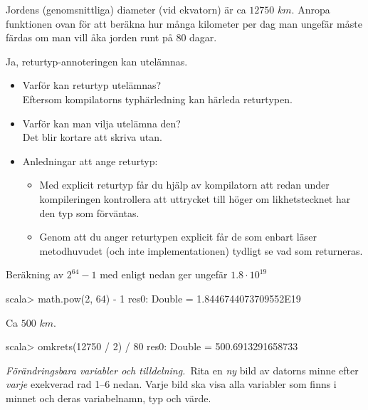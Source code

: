 \Subtask Jordens (genomsnittliga) diameter (vid ekvatorn) är ca $12 750$ $km$. Anropa funktionen  ovan för att beräkna hur många kilometer per dag man ungefär måste färdas om man vill åka jorden runt på 80 dagar. 

\SOLUTION

\TaskSolved \what

\SubtaskSolved Ja, returtyp-annoteringen  kan utelämnas. 

\begin{itemize}
\item Varför kan returtyp utelämnas?\\Eftersom kompilatorns typhärledning kan härleda returtypen. 
\item Varför kan man vilja utelämna den?\\Det blir kortare att skriva utan. 
\item Anledningar att ange returtyp: 
\begin{itemize}
\item  Med explicit returtyp får du hjälp av kompilatorn att redan under kompileringen kontrollera att uttrycket till höger om likhetstecknet har den typ som förväntas. 

\item Genom att du anger returtypen explicit får de som enbart läser metodhuvudet (och inte implementationen)
 tydligt se vad som returneras.
\end{itemize}
\end{itemize}	


\SubtaskSolved Beräkning av $2^{64} - 1$ med  enligt nedan ger ungefär $1.8 \cdot 10^{19}$
\begin{REPL}
scala> math.pow(2, 64) - 1
res0: Double = 1.8446744073709552E19
\end{REPL}


\SubtaskSolved Ca $500$ $km$.
\begin{REPL}
scala> omkrets(12750 / 2) / 80
res0: Double = 500.6913291658733
\end{REPL}

\QUESTEND




\def\what{\emph{Förändringsbara variabler och tilldelning.}}

\QUESTBEGIN

\Task \what~Rita en \emph{ny} bild av datorns minne efter \emph{varje} exekverad rad 1--6 nedan. Varje bild ska visa alla variabler som finns i minnet och deras variabelnamn, typ och värde.


